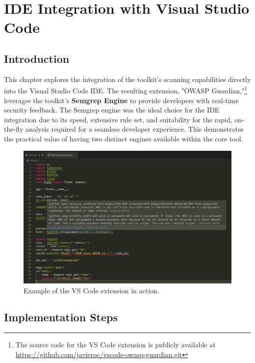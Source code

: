 \chapter{IDE Integration with Visual Studio Code}
\label{chap:ide}


\section{Introduction}

This chapter explores the integration of the toolkit's scanning capabilities directly into the Visual Studio Code IDE. The resulting extension, "OWASP Guardian,"\footnote{The source code for the VS Code extension is publicly available at \url{https://github.com/javieroc/vscode-owasp-guardian.git}} leverages the toolkit's \textbf{Semgrep Engine} to provide developers with real-time security feedback. The Semgrep engine was the ideal choice for the IDE integration due to its speed, extensive rule set, and suitability for the rapid, on-the-fly analysis required for a seamless developer experience. This demonstrates the practical value of having two distinct engines available within the core tool.

\begin{figure}[h!]
    \centering
    \includegraphics[width=\textwidth]{images/vscode-example.png}
    \caption{Example of the VS Code extension in action.}
    \label{fig:vscode-example}
\end{figure}


\section{Implementation Steps}

